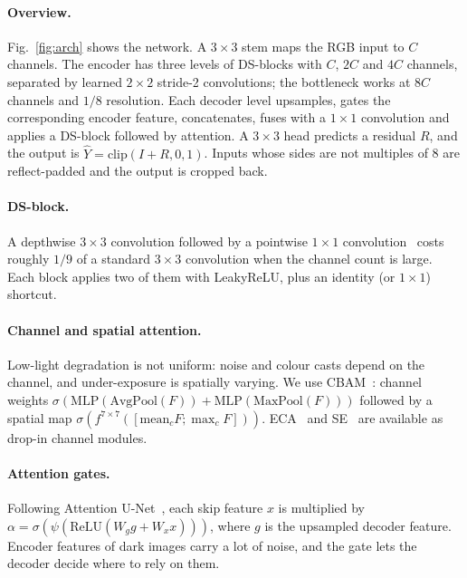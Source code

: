 \documentclass[10pt,twocolumn,letterpaper]{article}
\begin{document}
\paragraph{Overview.} Fig.~\ref{fig:arch} shows the network. A $3\times3$ stem
maps the RGB input to $C$ channels. The encoder has three levels of
DS-blocks with $C$, $2C$ and $4C$ channels, separated by learned
$2\times2$ stride-2 convolutions; the bottleneck works at $8C$ channels and
$1/8$ resolution. Each decoder level upsamples, gates the corresponding
encoder feature, concatenates, fuses with a $1\times1$ convolution and applies
a DS-block followed by attention. A $3\times3$ head predicts a residual
$R$, and the output is $\hat{Y}=\mathrm{clip}(I+R,0,1)$. Inputs whose sides are
not multiples of 8 are reflect-padded and the output is cropped back.

\paragraph{DS-block.} A depthwise $3\times3$ convolution followed by a
pointwise $1\times1$ convolution~\cite{howard2017mobilenets} costs roughly
$1/9$ of a standard $3\times3$ convolution when the channel count is large. Each block applies
two of them with LeakyReLU, plus an identity (or $1\times1$) shortcut.

\paragraph{Channel and spatial attention.} Low-light degradation is not
uniform: noise and colour casts depend on the channel, and under-exposure is
spatially varying. We use CBAM~\cite{woo2018cbam}: channel weights
$\sigma(\mathrm{MLP}(\mathrm{AvgPool}(F))+\mathrm{MLP}(\mathrm{MaxPool}(F)))$
followed by a spatial map $\sigma(f^{7\times7}([\mathrm{mean}_c F;\max_c F]))$.
ECA~\cite{wang2020eca} and SE~\cite{hu2018squeeze} are available as drop-in
channel modules.

\paragraph{Attention gates.} Following Attention U-Net~\cite{oktay2018attention},
each skip feature $x$ is multiplied by
$\alpha=\sigma(\psi(\mathrm{ReLU}(W_g g + W_x x)))$, where $g$ is the upsampled
decoder feature. Encoder features of dark images carry a lot of
noise, and the gate lets the decoder decide where to rely on them.
\end{document}
